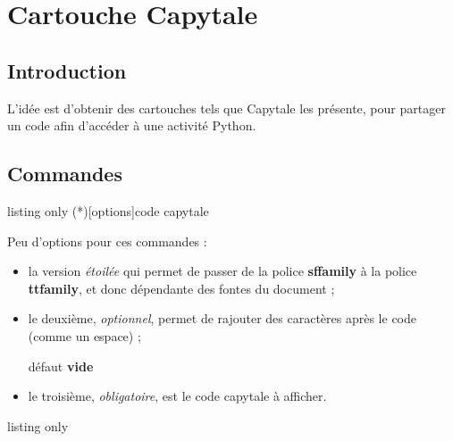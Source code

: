 \documentclass[a4paper,french,11pt]{article}
\newcommand\Cle[1]{{\bfseries\sffamily\textlangle \textcolor{orange!75!black}{#1}\textrangle}}
\begin{document}
\newpage

\section{Cartouche Capytale}\label{capytale}

\subsection{Introduction}

\begin{tipblock}
L'idée est d'obtenir des \textsf{cartouches} tels que \textsf{Capytale} les présente, pour partager un code afin d'accéder à une activité \textsf{Python}.
\end{tipblock}

\subsection{Commandes}

\begin{PresCodeTexPL}{listing only}
\CartoucheCapytale(*)[options]{code capytale}
\end{PresCodeTexPL}

\begin{cautionblock}
Peu d'options pour ces commandes :

\begin{itemize}
	\item la version \textit{étoilée} qui permet de  passer de la police \Cle{sffamily} à la police \Cle{ttfamily}, et donc dépendante des fontes du document ;
	\item le deuxième, \textit{optionnel}, permet de rajouter des caractères après le code (comme un \textsf{espace}) ;
	
	\hfill{}défaut \Cle{vide}
	\item le troisième, \textit{obligatoire}, est le \textsf{code capytale} à afficher.
\end{itemize}
\vspace*{-\baselineskip}\leavevmode
\end{cautionblock}

\begin{PresCodeTexPL}{listing only}



\end{PresCodeTexPL}
\end{document}
